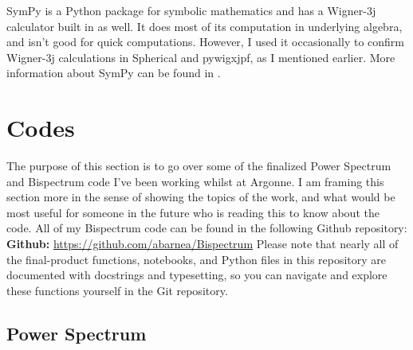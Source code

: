 \documentclass[11pt]{article}
\renewcommand{\_}[1]{\underline{ #1 }}
\newcommand{\npar}{\vspace{.3cm}\newline}
\begin{document}
{SymPy is a Python package for symbolic mathematics and has a Wigner-3j calculator built in as well. It does most of its computation in underlying algebra, and isn't good for quick computations. However, I used it occasionally to confirm Wigner-3j calculations in Spherical and pywigxjpf, as I mentioned earlier. More information about SymPy can be found in \cite{SymPy}.

\section{Codes}\label{code}

The purpose of this section is to go over some of the finalized Power Spectrum and Bispectrum code I've been working whilst at Argonne. I am framing this section more in the sense of showing the topics of the work, and what would be most useful for someone in the future who is reading this to know about the code. All of my Bispectrum code can be found in the following Github repository:
\npar
\textbf{Github:} \href{https://github.com/abarnea/Bispectrum}{https://github.com/abarnea/Bispectrum}
\npar
Please note that nearly all of the final-product functions, notebooks, and Python files in this repository are documented with docstrings and typesetting, so you can navigate and explore these functions yourself in the Git repository.

\subsection{Power Spectrum}\label{pscode}

}
\end{document}
